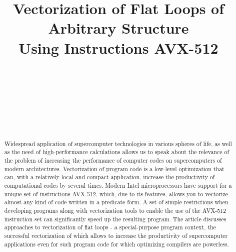 \documentclass[
11pt,%
tightenlines,%
twoside,%
onecolumn,%
nofloats,%
nobibnotes,%
nofootinbib,%
superscriptaddress,%
noshowpacs,%
centertags]%
{revtex4}
\begin{document}

\title{Vectorization of Flat Loops of Arbitrary Structure\\Using Instructions AVX-512}

\author{~}

\author{~}

\author{~}

\author{~}



\begin{abstract}
Widespread application of supercomputer technologies in various spheres of life, as well as the need of high-performance calculations allows us to speak about the relevance of the problem of increasing the performance of computer codes on supercomputers of modern architectures.
Vectorization of program code is a low-level optimization that can, with a relatively local and compact application, increase the productivity of computational codes by several times.
Modern Intel microprocessors have support for a unique set of instructions AVX-512, which, due to its features, allows you to vectorize almost any kind of code written in a predicate form.
A set of simple restrictions when developing programs along with vectorization tools to enable the use of the AVX-512 instruction set can significantly speed up the resulting program.
The article discusses approaches to vectorization of flat loops - a special-purpose program context, the successful vectorization of which allows to increase the productivity of supercomputer applications even for such program code for which optimizing compilers are powerless.
\end{abstract}
\end{document}
